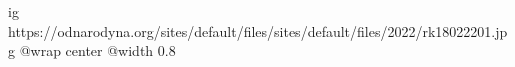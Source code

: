 
 
 
 
 

\ifcmt
  ig https://odnarodyna.org/sites/default/files/sites/default/files/2022/rk18022201.jpg
  @wrap center
  @width 0.8
\fi
